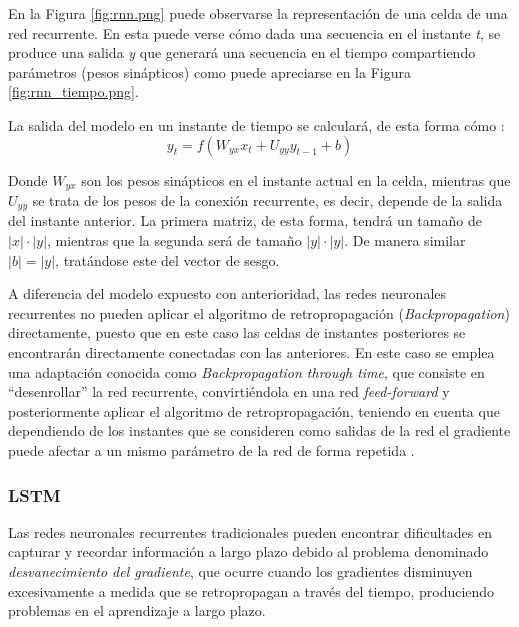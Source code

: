 
En la Figura \ref{fig:rnn.png} puede observarse la representación de una celda de una red recurrente. En
esta puede verse cómo dada una secuencia en el instante \textit{t}, se produce una salida 
\textit{y} que generará una secuencia en el tiempo compartiendo parámetros (pesos sinápticos) como puede apreciarse
en la Figura \ref{fig:rnn_tiempo.png}.


La salida del modelo en un instante de tiempo se calculará, de esta forma cómo \cite{book:rue2019}:
\begin{equation}
    y_t = f(W_{yx}x_t + U_{yy} y_{t-1} + b) 
\end{equation}

Donde \(W_{yx}\) son los pesos sinápticos en el instante actual en la celda, mientras que \(U_{yy}\) se
trata de los pesos de la conexión recurrente, es decir, depende de la salida del instante anterior.
La primera matriz, de esta forma, tendrá un tamaño de \(|x| \cdot |y|\), mientras que la segunda
será de tamaño \(|y| \cdot  |y|\). De manera similar \(|b| = |y|\), tratándose este del vector de sesgo.

A diferencia del modelo expuesto con anterioridad, las redes neuronales recurrentes no pueden aplicar el algoritmo de retropropagación (\textit{Backpropagation})
directamente, puesto que en este caso las celdas de instantes posteriores se encontrarán directamente conectadas con las anteriores.
En este caso se emplea una adaptación conocida como \textit{Backpropagation through time}, que consiste en ``desenrollar'' la red recurrente, convirtiéndola
en una red \textit{feed-forward} y posteriormente aplicar el algoritmo de retropropagación, teniendo en cuenta que dependiendo de los instantes 
que se consideren como salidas de la red el gradiente puede afectar a un mismo parámetro de la red de forma repetida \cite{book:rue2019}.

\subsubsection{LSTM}
Las redes neuronales recurrentes tradicionales pueden encontrar dificultades en capturar y recordar información
a largo plazo debido al problema denominado \textit{desvanecimiento del gradiente}, que ocurre
cuando los gradientes disminuyen excesivamente a medida que se retropropagan a través
del tiempo, produciendo problemas en el aprendizaje a largo plazo.

